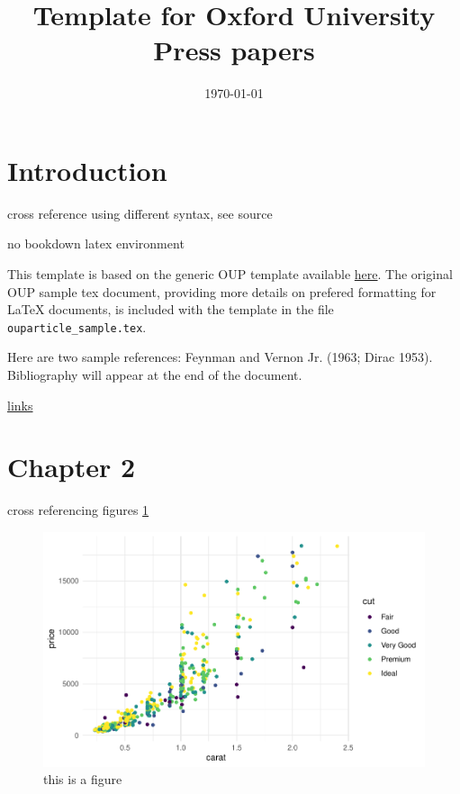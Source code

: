 \documentclass[12pt,halfline,a4paper,]{ouparticle}
\begin{document}
\title{Template for Oxford University Press papers}

\author{%
\address{Some Institute of Technology}
}


\date{\today}


\maketitle



\hypertarget{introduction}{%
\section{Introduction}\label{introduction}}

cross reference using different syntax, see source

no bookdown latex environment

This template is based on the generic OUP template available \href{https://academic.oup.com/icesjms/pages/General_Instructions}{here}. The original OUP sample tex document, providing more details on prefered formatting for LaTeX documents, is included with the template in the file \texttt{ouparticle\_sample.tex}.

Here are two sample references: Feynman and Vernon Jr. (1963; Dirac 1953). Bibliography will appear at the end of the document.

\href{qiushi.rbind.io}{links}

\hypertarget{chapter-2}{%
\section{Chapter 2}\label{chapter-2}}

cross referencing figures \ref{fig:diamond}

\begin{figure}[p]
\includegraphics[width=1\linewidth]{oxford-press_files/figure-latex/diamond-1} \caption{this is a figure}\label{fig:diamond}
\end{figure}
\end{document}
